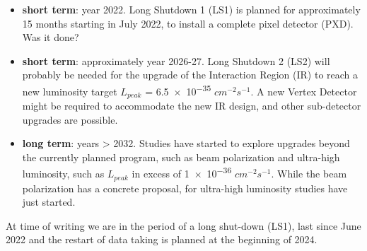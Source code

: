 \begin{itemize}
\item \textbf{short term}: year 2022. Long Shutdown 1 (LS1) is planned for approximately 15 months starting in July 2022, to install a complete pixel detector (PXD). Was it done?
\item \textbf{short term}: approximately year 2026-27. Long Shutdown 2 (LS2) will probably be needed for the upgrade of the Interaction Region (IR) to reach a new luminosity target $\textit{L}_{peak}$ = \num{6.5e-35} $cm^{-2}s^{-1}$. A new Vertex Detector might be required to accommodate the new IR design, and other sub-detector upgrades are possible.
\item \textbf{long term}: years > 2032. Studies have started to explore upgrades beyond the currently planned program, such as beam polarization and ultra-high luminosity, such as $\textit{L}_{peak}$ in excess of \num{1e-36} $cm^{-2}s^{-1}$. While the beam polarization has a concrete proposal, for ultra-high luminosity studies have just started.
\end{itemize}

At time of writing we are in the period of a long shut-down (LS1), last since June 2022 and the restart of data taking is planned at the beginning of 2024.













\begin{comment}
In this first chapter we will see a summary of the principal physics measurements on which the Belle II collaboration concentrates its efforts, focusing on the ones which could take particularly advantage from the upgrade of the vertex detector, discussed in this work. We will also go through the structure and the operation of the SuperKEKB accelerator and Belle II detector, to conclude with a short view on the actual state of measurements.
\end{comment}

